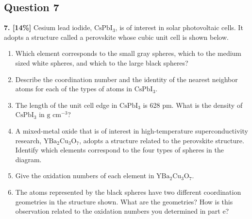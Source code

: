 \documentclass[10pt,a4paper]{article}
\begin{document}
\subsection*{Question 7}
\textbf{7. [14\%]} Cesium lead iodide, $\text{CsPbI}_3$, is of interest in solar photovoltaic cells. It adopts a structure called a perovskite whose cubic unit cell is shown below.
\begin{enumerate}[label=\alph*.]
    \vspace{5cm} \item Which element corresponds to the small gray spheres, which to the medium sized white spheres, and which to the large black spheres?
    \vspace{5cm} \item Describe the coordination number and the identity of the nearest neighbor atoms for each of the types of atoms in $\text{CsPbI}_3$.
    \vspace{5cm} \item The length of the unit cell edge in $\text{CsPbI}_3$ is 628 pm. What is the density of $\text{CsPbI}_3$ in $\text{g cm}^{-3}$?
    \vspace{5cm} \item A mixed-metal oxide that is of interest in high-temperature superconductivity research, $\text{YBa}_2\text{Cu}_3\text{O}_7$, adopts a structure related to the perovskite structure. Identify which elements correspond to the four types of spheres in the diagram.
    \vspace{5cm} \item Give the oxidation numbers of each element in $\text{YBa}_2\text{Cu}_3\text{O}_7$.
    \vspace{5cm} \item The atoms represented by the black spheres have two different coordination geometries in the structure shown. What are the geometries? How is this observation related to the oxidation numbers you determined in part e?
\end{enumerate}
\end{document}
